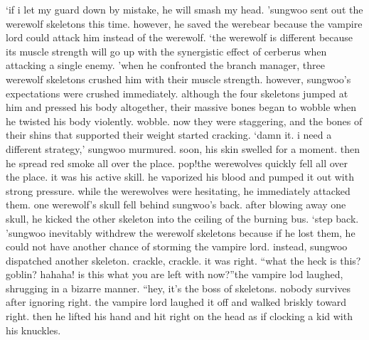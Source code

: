 ‘if i let my guard down by mistake, he will smash my head.
’sungwoo sent out the werewolf skeletons this time.
 however, he saved the werebear because the vampire lord could attack him instead of the werewolf.
‘the werewolf is different because its muscle strength will go up with the synergistic effect of cerberus when attacking a single enemy.
’when he confronted the branch manager, three werewolf skeletons crushed him with their muscle strength.
 however, sungwoo’s expectations were crushed immediately.
although the four skeletons jumped at him and pressed his body altogether, their massive bones began to wobble when he twisted his body violently.
 wobble.
 now they were staggering, and the bones of their shins that supported their weight started cracking.
‘damn it.
 i need a different strategy,’ sungwoo murmured.
soon, his skin swelled for a moment.
 then he spread red smoke all over the place.
pop!the werewolves quickly fell all over the place.
 it was his active skill.
he vaporized his blood and pumped it out with strong pressure.
 while the werewolves were hesitating, he immediately attacked them.
one werewolf’s skull fell behind sungwoo’s back.
 after blowing away one skull, he kicked the other skeleton into the ceiling of the burning bus.
‘step back.
’sungwoo inevitably withdrew the werewolf skeletons because if he lost them, he could not have another chance of storming the vampire lord.
instead, sungwoo dispatched another skeleton.
crackle, crackle.
 it was right.
“what the heck is this? goblin? hahaha! is this what you are left with now?”the vampire lod laughed, shrugging in a bizarre manner.
“hey, it’s the boss of skeletons.
 nobody survives after ignoring right.
the vampire lord laughed it off and walked briskly toward right.
then he lifted his hand and hit right on the head as if clocking a kid with his knuckles.


 